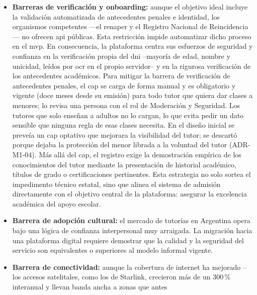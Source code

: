 \begin{itemize}
    \item \textbf{Barreras de verificación y onboarding:} aunque el
          objetivo ideal incluye la validación automatizada de
          antecedentes penales e identidad, los organismos competentes
          ---el \gls{renaper} y el Registro Nacional de Reincidencia--- no ofrecen
          \gls{api} públicas. Esta restricción impide automatizar dicho
          proceso en el \gls{mvp}. En consecuencia, la plataforma
          centra sus esfuerzos de seguridad y confianza en la
          verificación propia del \gls{dni} --mayoría de edad, nombre y
          unicidad, leídos por \gls{ocr} en el propio servidor-- y en la
          rigurosa verificación de los antecedentes académicos. Para
          mitigar la barrera de verificación de antecedentes penales, el
          \gls{cap} se carga de forma manual y es obligatorio y vigente
          (doce meses desde su emisión) para todo tutor que quiera dar
          clases a menores; lo revisa una persona con el rol de
          Moderación y Seguridad. Los tutores que solo enseñan a adultos
          no lo cargan, lo que evita pedir un dato sensible que ninguna
          regla de esas clases necesita. En el diseño inicial se preveía
          un \gls{cap} optativo que mejorara la visibilidad del tutor; se
          descartó porque dejaba la protección del menor librada a la
          voluntad del tutor (ADR-M1-04). Más allá del \gls{cap}, el
          registro exige la demostración empírica de los
          conocimientos del tutor mediante la presentación de historial
          académico, títulos de grado o certificaciones pertinentes. Esta
          estrategia no solo sortea el impedimento técnico estatal, sino
          que alinea el sistema de admisión directamente con el objetivo
          central de la plataforma: asegurar la excelencia académica del
          apoyo escolar.
    \item \textbf{Barrera de adopción cultural:} el mercado de tutorías
          en Argentina opera bajo una lógica de confianza interpersonal
          muy arraigada. La migración hacia una plataforma digital
          requiere demostrar que la calidad y la seguridad del servicio
          son equivalentes o superiores al modelo informal vigente.
    \item \textbf{Barrera de conectividad:} aunque la cobertura de
          internet ha mejorado --los accesos satelitales, como los de
          Starlink, crecieron más de un 300\,\% interanual
          \citep{dplsatelital2026} y llevan banda ancha a zonas que antes

\end{itemize}
